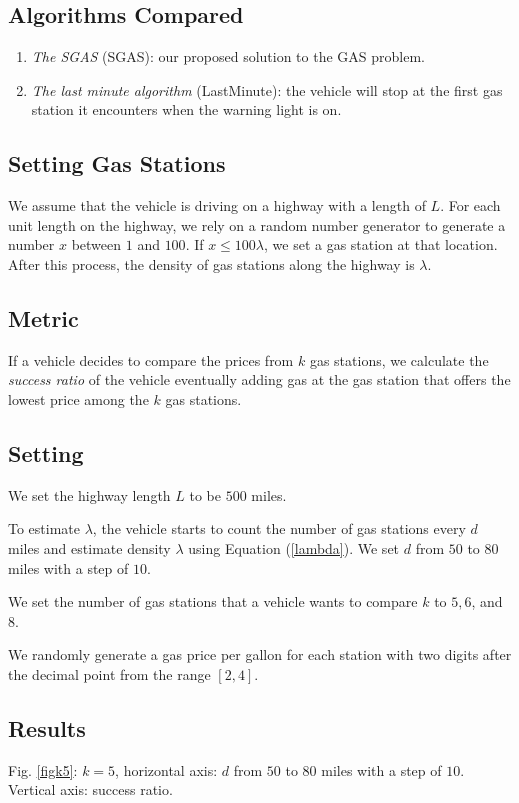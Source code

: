 \documentclass[conference]{IEEEtran}
\theoremstyle{definition}
\begin{document}
\subsection{Algorithms Compared}
\begin{enumerate}
\item {\em The SGAS} (SGAS): our proposed solution to the GAS problem.
\item {\em The last minute algorithm} (LastMinute):  the vehicle will stop at the first gas station it encounters when the warning light is on.

\end{enumerate}

\subsection{Setting Gas Stations}
We assume that the vehicle is driving on a highway with a length of $L$. For each unit length on the highway,  we rely on a random number generator to generate a number $x$ between $1$ and $100$. If $x \leq 100\lambda$, we set a gas station at that location. After this process, the density of gas stations along the highway is $\lambda$.

\subsection{Metric}
If a vehicle decides to compare the prices from $k$ gas stations, we calculate the {\em success ratio} of the vehicle eventually adding gas at the gas station that offers the lowest price among the $k$ gas stations.

\subsection{Setting}
We set the highway length $L$ to be $500$ miles.

To estimate $\lambda$, the vehicle starts to count the number of gas stations every $d$ miles and estimate  density $\lambda$ using Equation (\ref{lambda}). We set $d$ from $50$ to $80$ miles with a step of $10$.

We set the number of gas stations that a vehicle wants to compare $k$ to $5, 6$, and $8$.

We randomly generate a gas price per gallon for each station with two digits after the decimal point from the range $[2, 4]$.

\subsection{Results}
Fig. \ref{figk5}: $k=5$, horizontal axis: $d$ from $50$ to $80$ miles with a step of $10$. Vertical axis: success ratio.
\end{document}
